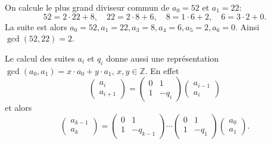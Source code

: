 \begin{example}
  \label{exe:25}
  On calcule le plus grand diviseur commun de $a_0 = 52$ et $a_1=22$:
  \begin{displaymath}
    52 =   2 ⋅ 22 + 8, \quad 22 = 2 ⋅ 8  + 6, \quad 8 = 1 ⋅ 6 +2,\quad 6 = 3 ⋅2 + 0. 
  \end{displaymath}
  La suite est alors $a_{0}= 52, a_{1}= 22, a_{3} = 8, a_{4} = 6, a_{5} = 2, a_{6} = 0$. Ainsi $\gcd(52,22) = 2$. 
\end{example}

Le calcul des suites $a_i$ et $q_i$ donne aussi une représentation $\gcd(a_0,a_1) = x ⋅a_0 + y ⋅a_1$, $x,y ∈ℤ$. En effet
\begin{displaymath}
  \begin{pmatrix}
    a_{i} \\  a_{i+1} 
  \end{pmatrix}
  =
  \begin{pmatrix}
    0 & 1 \\
    1 & -q_i
  \end{pmatrix}
  \begin{pmatrix}
     a_{i-1} \\  a_{i}
   \end{pmatrix}
\end{displaymath}
et alors
\begin{displaymath}
  \begin{pmatrix}
    a_{k-1} \\ a_k
  \end{pmatrix} =
  \begin{pmatrix}
    0 & 1 \\
    1 & -q_{k-1}
  \end{pmatrix} \cdots
  \begin{pmatrix}
    0 & 1 \\
    1 & -q_{1}
  \end{pmatrix}
  \begin{pmatrix}
    a_0 \\ a_1
  \end{pmatrix}.
\end{displaymath}
